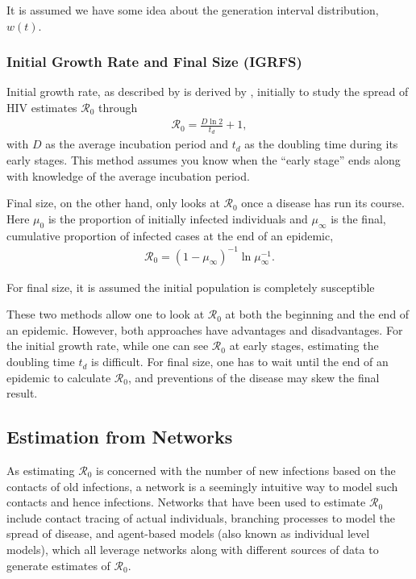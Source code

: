 \documentclass[12pt]{article}
\newcommand{\rr}{\ensuremath{\mathcal{R}_0}}
\begin{document}
  It is assumed we have some idea about the generation interval distribution, $w(t)$.

\subsubsection{Initial Growth Rate and Final Size (IGRFS)}
\label{sec:igr-fs}

Initial growth rate, as described by \cite{dietz1993estimation} is derived by \cite{anderson1986}, initially to study the spread of HIV estimates $\rr$ through
\begin{align*}
\rr = \frac{D \ln 2} {t_d} + 1,
  \end{align*}
  with $D$ as the average incubation period and $t_d$ as the doubling time during its early stages.  This method assumes you know when the ``early stage'' ends along with knowledge of the average incubation period.  

  Final size, on the other hand, only looks at $\rr$ once a disease has run its course.  Here $\mu_0$ is the proportion of initially infected individuals and $\mu_\infty$ is the final, cumulative proportion of infected cases at the end of an epidemic,
  \begin{align*}
    \rr = (1- \mu_\infty)^{-1} \ln \mu_\infty^{-1}.
  \end{align*}

  For final size, it is assumed the initial population is completely susceptible

  These two methods allow one to look at $\rr$ at both the beginning and the end of an epidemic.  However, both approaches have advantages and disadvantages.  For the initial growth rate, while one can see $\rr$ at early stages, estimating the doubling time $t_d$ is difficult.  For final size, one has to wait until the end of an epidemic to calculate $\rr$, and preventions of the disease may skew the final result.

  \subsection{Estimation from Networks}
As estimating $\rr$ is concerned with the number of new infections based on the contacts of old infections, a network is a seemingly intuitive way to model such contacts and hence infections.  Networks that have been used to estimate $\rr$ include contact tracing of actual individuals, branching processes to model the spread of disease, and agent-based models (also known as individual level models), which all leverage networks along with different sources of data to generate estimates of $\rr$.
  
\end{document}
